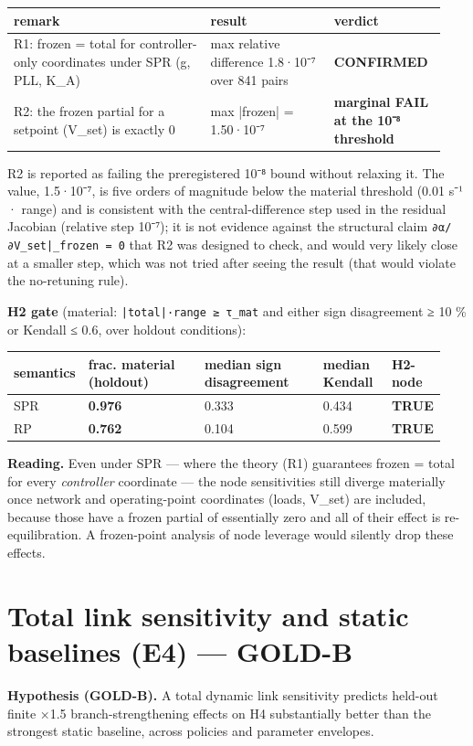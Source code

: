 \documentclass[10pt,a4paper]{article}
\begin{document}
{\small
\begin{longtable}{L{0.435\linewidth}L{0.276\linewidth}L{0.229\linewidth}}
\toprule
\textbf{remark} & \textbf{result} & \textbf{verdict} \\
\midrule
\endhead
R1: frozen = total for controller-only coordinates under SPR (g, PLL, K\_A) & max relative difference 1.8·10⁻⁷ over 841 pairs & \textbf{CONFIRMED} \\
R2: the frozen partial for a setpoint (V\_set) is exactly 0 & max |frozen| = 1.50·10⁻⁷ & \textbf{marginal FAIL at the 10⁻⁸ threshold} \\
\bottomrule
\end{longtable}}
R2 is reported as failing the preregistered 10⁻⁸ bound without relaxing it. The value, 1.5·10⁻⁷, is five orders of magnitude below the material threshold (0.01 s⁻¹ · range) and is consistent with the central-difference step used in the residual Jacobian (relative step 10⁻⁷); it is not evidence against the structural claim \texttt{∂α/\allowbreak{}∂V\_\allowbreak{}set|\_\allowbreak{}frozen =\allowbreak{} 0} that R2 was designed to check, and would very likely close at a smaller step, which was not tried after seeing the result (that would violate the no-retuning rule).

\textbf{H2 gate} (material: \texttt{|total|·range ≥ τ\_\allowbreak{}mat} and either sign disagreement ≥ 10 \% or Kendall ≤ 0.6, over holdout conditions):

{\small
\begin{longtable}{L{0.107\linewidth}L{0.286\linewidth}L{0.286\linewidth}L{0.167\linewidth}L{0.095\linewidth}}
\toprule
\textbf{semantics} & \textbf{frac. material (holdout)} & \textbf{median sign disagreement} & \textbf{median Kendall} & \textbf{H2-node} \\
\midrule
\endhead
SPR & \textbf{0.976} & 0.333 & 0.434 & \textbf{TRUE} \\
RP & \textbf{0.762} & 0.104 & 0.599 & \textbf{TRUE} \\
\bottomrule
\end{longtable}}
\textbf{Reading.} Even under SPR — where the theory (R1) guarantees frozen = total for every \emph{controller} coordinate — the node sensitivities still diverge materially once network and operating-point coordinates (loads, V\_set) are included, because those have a frozen partial of essentially zero and all of their effect is re-equilibration. A frozen-point analysis of node leverage would silently drop these effects.

\section{Total link sensitivity and static baselines (E4) — GOLD-B}
\textbf{Hypothesis (GOLD-B).} A total dynamic link sensitivity predicts held-out finite ×1.5 branch-strengthening effects on H4 substantially better than the strongest static baseline, across policies and parameter envelopes.
\end{document}
